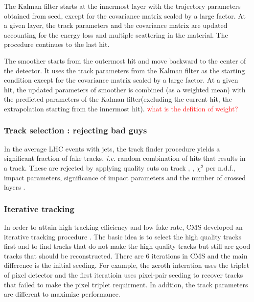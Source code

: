 The Kalman filter starts at the innermost layer with the trajectory 
parameters obtained from seed, except for the covariance matrix scaled 
by a large factor.  
At a given layer, the track parameters and the covariance matrix are updated
accounting for the energy loss and multiple scattering in the material.
The procedure continues to the last hit.

The smoother starts from the outermost hit and move backward to the center of the detector. 
It uses the track parameters from the Kalman filter as the starting condition 
except for the covariance matrix scaled by a large factor. 
At a given hit, the updated parameters of smoother is combined (as a weighted mean) 
with the predicted parameters of the Kalman filter(excluding the current hit, 
the extrapolation starting from the innermost hit).
\textcolor{red}{what is the defition of weight?} 

\subsubsection{Track selection : rejecting bad guys }

In the average LHC events with jets, the track finder procedure yields 
a significant fraction of fake tracks, \textit{i.e.} random combination 
of hits that results in a track. These are rejected by applying 
quality cuts on track \Eta, \pt{}, $\chi^2$ per n.d.f., impact parameters,
significance of impact parameters
and the number of crossed layers \cite{cmsnotetrackfilter}. 

\subsubsection{Iterative tracking}

In order to attain high tracking efficiency and low fake rate, 
CMS developed an iterative tracking procedure \cite{cmsnoteiterativetracking}. 
The basic idea is to select the high quality tracks first and 
to find tracks that do not make the high quality tracks 
but still are good tracks that should be reconstructed. 
There are 6 iterations in CMS and the main difference is 
the initial seeding. For example, the zeroth interation uses 
the triplet of pixel detector and the first iteratioin uses 
pixel-pair seeding to recover tracks that failed to make 
the pixel triplet requirment. In addtion, the track parameters 
are different to maximize performance.





